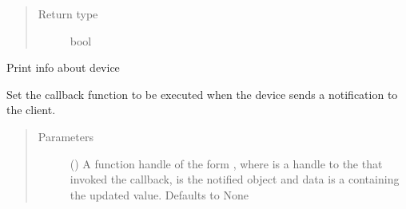 \documentclass[letterpaper,10pt,english]{sphinxmanual}
\begin{document}
\begin{fulllineitems}
\begin{fulllineitems}
\begin{quote}
\begin{description}
\item[{Return type}] \leavevmode
bool

\end{description}\end{quote}

\end{fulllineitems}


\begin{fulllineitems}
\label{\detokenize{PandaBot:PandaBot.PandaBotDevice.printInfo}}
Print info about device

\end{fulllineitems}


\begin{fulllineitems}
\label{\detokenize{PandaBot:PandaBot.PandaBotDevice.setNotificationCallback}}
Set the callback function to be executed when the device sends a notification to the client.
\begin{quote}\begin{description}
\item[{Parameters}] \leavevmode
{} (\sphinxstyleliteralemphasis{\sphinxupquote{, }}) \textendash{} A function handle of the form , where  is a handle to the {\hyperref[\detokenize{PandaBot:PandaBot.PandaBotClient}]{}} that invoked the callback,  is the notified  object and data is a  containing the updated value. Defaults to None

\end{description}\end{quote}

\end{fulllineitems}


\end{fulllineitems}
\end{document}
